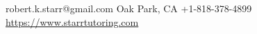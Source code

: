 \documentclass[lighthipster]{simplehipstercv}
\newlength{\rightcolwidth}
\begin{document}
\begin{paracol}{2}
\begin{minipage}[t]{0.3\textwidth}


\end{minipage}






\vfill{} %

\setlength{\parindent}{0pt}
\begin{minipage}[t]{\rightcolwidth}
    \begin{center}\fontfamily{\sfdefault}\selectfont \color{black!70}
    {\small{} robert.k.starr@gmail.com
     Oak Park, CA 
    +1-818-378-4899 \newline{}
    \protect\url{https://www.starrtutoring.com} }
    \end{center}
    \end{minipage}

\end{paracol}
\end{document}
